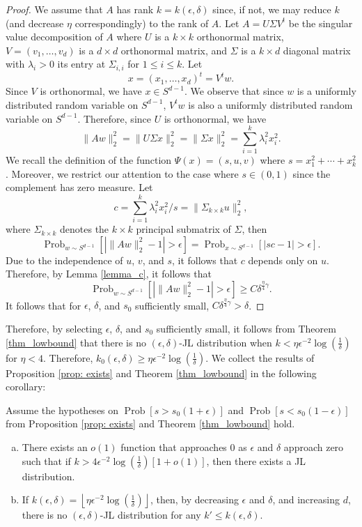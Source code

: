 \documentclass[twoside,11pt]{article}
\newcommand{\pP}[1]{\operatorname{Prob}\left[ #1 \right] }
\newcommand{\pPP}[2]{\operatorname{Prob}_{#2} \left[ #1 \right] }
\begin{document}
\begin{proof}
We assume that $A$ has rank $k=k(\epsilon,\delta)$ since, if not, we may reduce $k$ (and decrease $\eta$ correspondingly) to the rank of $A$.
Let $A=U\Sigma V^t$ be the singular value decomposition of $A$ where $U$ is a $k \times k$ orthonormal matrix, $V= (v_1, \ldots, v_d)$ is a $d \times d$ orthonormal matrix, 
and $\Sigma$ is a $k \times d$ diagonal matrix with $\lambda_i> 0$ its entry at $\Sigma_{i,i}$ for $1 \leq i \leq k$.
Let   
\[ x = (x_1, \ldots, x_d)^t = V^t w.\] 
Since $V$ is orthonormal,  we have  $x \in S^{d-1}$.  We observe that since $w$ is a uniformly distributed random variable on $S^{d-1}$, $V^tw$ is also a uniformly distributed random variable on $S^{d-1}$.
Therefore, since $U$ is orthonormal, we have
      \[ \|Aw\|^2_2 = \|U \Sigma x\|^2_2 = \|\Sigma x\|^2_2 = \sum_{i=1}^k \lambda_i^2x_i^2.\]	
We recall the definition of the function $\Psi(x)=(s,u,v)$ where $s = x_1^2 + \cdots + x_k^2$.  Moreover, we restrict our attention to the case where $s\in(0,1)$ since the complement has zero measure.
Let 
\[ c =  \sum_{i=1}^k \lambda_i^2x_i^2/s = \|\Sigma_{k\times k} u \|^2_2,\]
where $\Sigma_{k\times k}$ denotes the $k\times k$ principal submatrix of $\Sigma$,
then
\[
\pPP{\left|\|Aw\|^2_2-1\right|> \epsilon}{w\sim S^{d-1}}  =  \pPP{\left|s c -1\right|>\epsilon}{x\sim S^{d-1}}.\]
Due to the independence of $u$, $v$, and $s$, it follows that $c$ depends only on $u$.  Therefore, by Lemma \ref{lemma_c}, it follows that 
$$
\pPP{\left| \|Aw\|_2^2 -1\right| > \epsilon}{w\sim S^{d-1}}  \geq  C\delta^{\frac{\eta}{4}\gamma}.
$$
It follows that for $\epsilon$, $\delta$, and $s_0$ sufficiently small, $C\delta^{\frac{\eta}{4}\gamma}>\delta$.
\end{proof}
Therefore, by selecting $\epsilon$, $\delta$, and $s_0$ sufficiently small, it follows from Theorem \ref{thm_lowbound} that there is no $(\epsilon, \delta)$-JL distribution when $k< \eta\epsilon^{-2} \log \left(  \frac{1}{\delta}  \right)$ for $\eta<4$.  Therefore, $k_0(\epsilon,\delta)\geq\eta\epsilon^{-2}\log\left(\frac{1}{\delta}\right)$.
We collect the results of Proposition \ref{prop: exists} and Theorem \ref{thm_lowbound} in the following corollary:
\begin{corollary}
Assume the hypotheses on 
$\pP{s>s_0(1+\epsilon)}$ and $\pP{s<s_0(1-\epsilon)}$
from Proposition \ref{prop: exists} and Theorem \ref{thm_lowbound} hold.
\begin{enumerate}[(a)]
\item There exists an $o(1)$ function that approaches $0$ as $\epsilon$ and $\delta$ approach zero such that if $k>4\epsilon^{-2} \log \left( \frac{1}{\delta} \right)\left[1+o(1)\right]$, then there exists a JL distribution. 
\item If $k(\epsilon,\delta)=\left\lfloor\eta\epsilon^{-2} \log \left(  \frac{1}{\delta}  \right)\right\rfloor$, then, by decreasing $\epsilon$ and $\delta$, and increasing $d$, there is no $(\epsilon, \delta)$-JL distribution for any $k'\leq k(\epsilon,\delta)$.
\end{enumerate}
\end{corollary}
\end{document}
